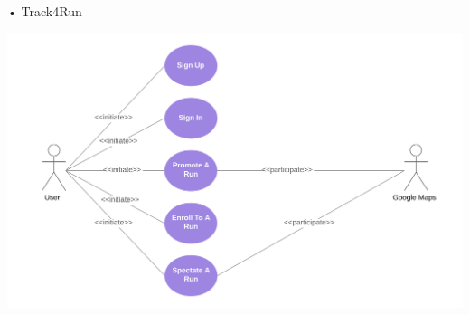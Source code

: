 \begin{enumerate}
\begin{minipage}{\textwidth}
\item[•]{\Large Track4Run}
\FloatBarrier
\begin{center}
\includegraphics[scale=0.70]{Images/UseCaseDiagrams/Track4RunCaseDiagram.png}
\end{center}
\FloatBarrier
\end{minipage}
\end{enumerate}
\clearpage 

